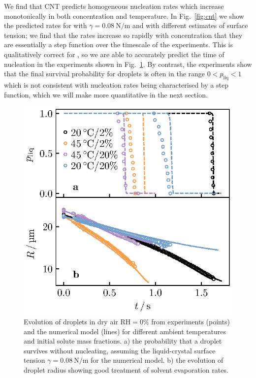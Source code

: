 \documentclass[11pt,twoside]{report}
\begin{document}
We find that CNT predicts homogeneous nucleation rates which increase monotonically in both concentration and temperature.
In Fig.\ \ref{fig:cnt} we show the predicted rates for  with $\gamma=\SI{0.08}{\newton\per\metre}$ and  with different estimates of surface tension; we find that the rates increase so rapidly with concentration that they are essentially a step function over the timescale of the experiments.
This is qualitatively correct for , so we are able to accurately predict the time of nucleation in the experiments shown in Fig.\ \ref{fig:nacl-trajectory}.
By contrast, the experiments show that the final survival probability for  droplets is often in the range $0 < p_\mathrm{liq} < 1$ which is not consistent with nucleation rates being characterised by a step function, which we will make more quantitative in the next section.

\begin{figure}
  \includegraphics[width=0.9\linewidth,outer]{nacl-trajectory}
  \caption[Evolution of  droplets: theory and experiments]{
    Evolution of  droplets in dry air $\mathrm{RH}=0\%$ from experiments (points) and the numerical model (lines) for different ambient temperatures and initial solute mass fractions.
    a) the probability that a droplet survives without nucleating, assuming the liquid-crystal surface tension $\gamma = \SI{0.08}{\newton\per\metre}$ \cite{DesarnaudJPCL2014} for the numerical model.
    b) the evolution of droplet radius showing good treatment of solvent evaporation rates.
  }
  \label{fig:nacl-trajectory}
\end{figure}
\end{document}
